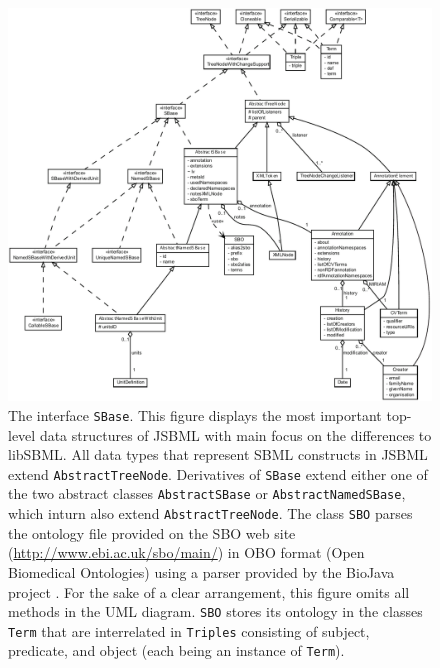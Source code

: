 \begin{figure}[p]
 \centering
 \includegraphics[width=\textwidth]{img/SBase.pdf}
 \caption[The interface \texttt{SBase}]{The interface \texttt{SBase}. 
This figure displays the most important top-level data
structures of JSBML with main focus on the differences to libSBML. All data
types that represent SBML constructs in JSBML extend \texttt{AbstractTreeNode}. 
Derivatives of \texttt{SBase} extend either one of the two abstract classes
\texttt{AbstractSBase} or \texttt{AbstractNamedSBase}, which inturn also extend
\texttt{AbstractTreeNode}. The class \texttt{SBO} parses the
ontology file provided on the SBO web site
(\url{http://www.ebi.ac.uk/sbo/main/}) in OBO format (Open Biomedical
Ontologies) using a parser provided by the BioJava project \citep{Holland2008}.
For the sake of a clear arrangement, this figure omits all methods in the UML
diagram. \texttt{SBO} stores its ontology in the classes \texttt{Term} that are
interrelated in \texttt{Triples} consisting of subject, predicate, and object
(each being an instance of \texttt{Term}).}
\end{figure}
